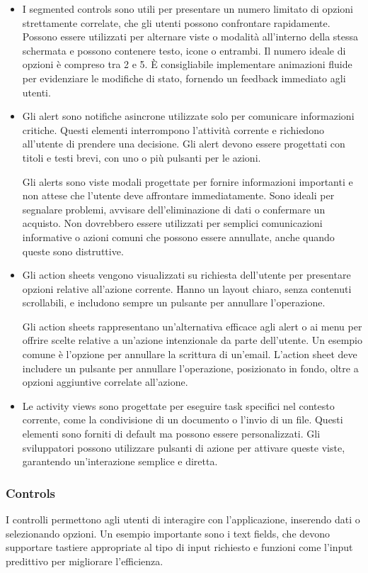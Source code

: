 \begin{itemize}
    \item I segmented controls sono utili per presentare un numero limitato di opzioni strettamente correlate, che gli utenti possono confrontare rapidamente. Possono essere utilizzati per alternare viste o modalità all'interno della stessa schermata e possono contenere testo, icone o entrambi. Il numero ideale di opzioni è compreso tra 2 e 5. È consigliabile implementare animazioni fluide per evidenziare le modifiche di stato, fornendo un feedback immediato agli utenti.

    \item Gli alert sono notifiche asincrone utilizzate solo per comunicare informazioni critiche. Questi elementi interrompono l’attività corrente e richiedono all’utente di prendere una decisione. Gli alert devono essere progettati con titoli e testi brevi, con uno o più pulsanti per le azioni.

    Gli alerts sono viste modali progettate per fornire informazioni importanti e non attese che l’utente deve affrontare immediatamente. Sono ideali per segnalare problemi, avvisare dell’eliminazione di dati o confermare un acquisto. Non dovrebbero essere utilizzati per semplici comunicazioni informative o azioni comuni che possono essere annullate, anche quando queste sono distruttive.

    \item Gli action sheets vengono visualizzati su richiesta dell'utente per presentare opzioni relative all'azione corrente. Hanno un layout chiaro, senza contenuti scrollabili, e includono sempre un pulsante per annullare l'operazione.

    Gli action sheets rappresentano un’alternativa efficace agli alert o ai menu per offrire scelte relative a un’azione intenzionale da parte dell’utente. Un esempio comune è l’opzione per annullare la scrittura di un’email. L’action sheet deve includere un pulsante per annullare l’operazione, posizionato in fondo, oltre a opzioni aggiuntive correlate all’azione.

    \item Le activity views sono progettate per eseguire task specifici nel contesto corrente, come la condivisione di un documento o l’invio di un file. Questi elementi sono forniti di default ma possono essere personalizzati. Gli sviluppatori possono utilizzare pulsanti di azione per attivare queste viste, garantendo un’interazione semplice e diretta.
\end{itemize}

\subsubsection{Controls}
I controlli permettono agli utenti di interagire con l’applicazione, inserendo dati o selezionando opzioni. Un esempio importante sono i text fields, che devono supportare tastiere appropriate al tipo di input richiesto e funzioni come l’input predittivo per migliorare l’efficienza.
